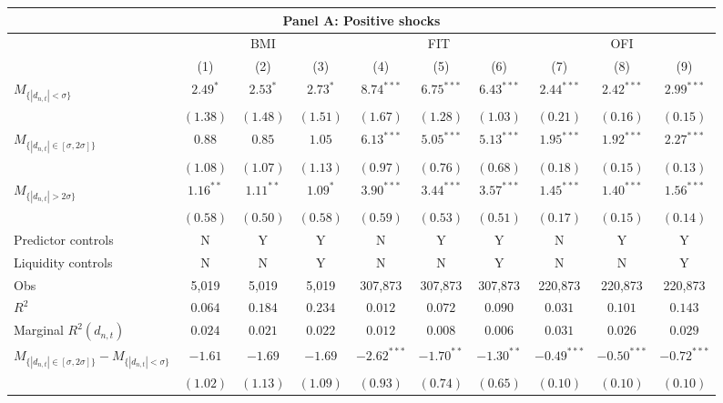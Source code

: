 \begin{tabular}{lccccccccc}
  \hline \multicolumn{10}{c}{Panel A: Positive shocks} \\
 \hline
  & \multicolumn{3}{c}{BMI} & \multicolumn{3}{c}{FIT} & \multicolumn{3}{c}{OFI} \\ 
  \cmidrule(l){2-4} \cmidrule(l){5-7} \cmidrule(l){8-10} 
  & (1) & (2) & (3) & (4) & (5) & (6) & (7) & (8) & (9) \\ 
  $M_{\{|d_{n,t}| < \sigma\}}$ & $2.49^{*}$ & $2.53^{*}$ & $2.73^{*}$ & $8.74^{***}$ & $6.75^{***}$ & $6.43^{***}$ & $2.44^{***}$ & $2.42^{***}$ & $2.99^{***}$ \\ 
   & $(1.38)$ & $(1.48)$ & $(1.51)$ & $(1.67)$ & $(1.28)$ & $(1.03)$ & $(0.21)$ & $(0.16)$ & $(0.15)$ \\ 
  $M_{\{|d_{n,t}| \in [\sigma, 2\sigma]\}}$ & $0.88$ & $0.85$ & $1.05$ & $6.13^{***}$ & $5.05^{***}$ & $5.13^{***}$ & $1.95^{***}$ & $1.92^{***}$ & $2.27^{***}$ \\ 
   & $(1.08)$ & $(1.07)$ & $(1.13)$ & $(0.97)$ & $(0.76)$ & $(0.68)$ & $(0.18)$ & $(0.15)$ & $(0.13)$ \\ 
  $M_{\{|d_{n,t}| > 2 \sigma\}}$ & $1.16^{**}$ & $1.11^{**}$ & $1.09^{*}$ & $3.90^{***}$ & $3.44^{***}$ & $3.57^{***}$ & $1.45^{***}$ & $1.40^{***}$ & $1.56^{***}$ \\ 
   & $(0.58)$ & $(0.50)$ & $(0.58)$ & $(0.59)$ & $(0.53)$ & $(0.51)$ & $(0.17)$ & $(0.15)$ & $(0.14)$ \\ \vspace{5pt} 
  Predictor controls & N & Y & Y & N & Y & Y & N & Y & Y \\ 
  Liquidity controls & N & N & Y & N & N & Y & N & N & Y \\ \vspace{5pt} 
  Obs & 5,019 & 5,019 & 5,019 & 307,873 & 307,873 & 307,873 & 220,873 & 220,873 & 220,873 \\ 
  $R^2$ & $0.064$ & $0.184$ & $0.234$ & $0.012$ & $0.072$ & $0.090$ & $0.031$ & $0.101$ & $0.143$ \\ 
  Marginal $R^2(d_{n,t})$ & $0.024$ & $0.021$ & $0.022$ & $0.012$ & $0.008$ & $0.006$ & $0.031$ & $0.026$ & $0.029$ \\ 
 \hline
  $M_{\{|d_{n,t}| \in [\sigma, 2\sigma]\}} - M_{\{|d_{n,t}| < \sigma\}}$ & $-1.61$ & $-1.69$ & $-1.69$ & $-2.62^{***}$ & $-1.70^{**}$ & $-1.30^{**}$ & $-0.49^{***}$ & $-0.50^{***}$ & $-0.72^{***}$ \\ 
   & $(1.02)$ & $(1.13)$ & $(1.09)$ & $(0.93)$ & $(0.74)$ & $(0.65)$ & $(0.10)$ & $(0.10)$ & $(0.10)$ \\ 

\end{tabular}
